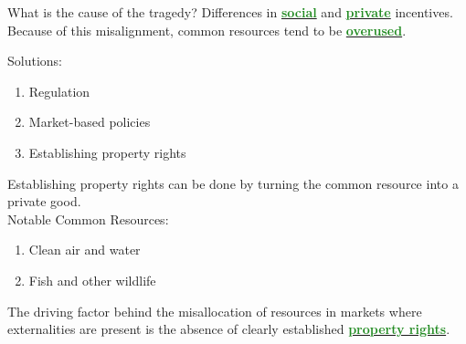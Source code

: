 \documentclass[11pt]{article}\usepackage[]{graphicx}\usepackage[]{color}
\theoremstyle{definition}
\newcommand{\blank}[1]{}
\newcommand{\dd}[1]{{\underline{\textbf{\textcolor{ForestGreen}{#1}}}}}
\begin{document}
	What is the cause of the tragedy? Differences in \dd{social} and \dd{private} incentives. Because of this misalignment, common resources tend to be \dd{overused}.
	\blank{}
	
	Solutions:
	\begin{enumerate}
		\item Regulation
		\item Market-based policies
		\item Establishing property rights
	\end{enumerate}
	
	Establishing property rights can be done by turning the common resource into a private good. 
	\\
	
	Notable Common Resources:
	\begin{enumerate}
		\item Clean air and water
		\item Fish and other wildlife
	\end{enumerate}
	\vspace{5pt}
	
	The driving factor behind the misallocation of resources in markets where externalities are present is the absence of clearly established \dd{property rights}.
	
\end{document}
